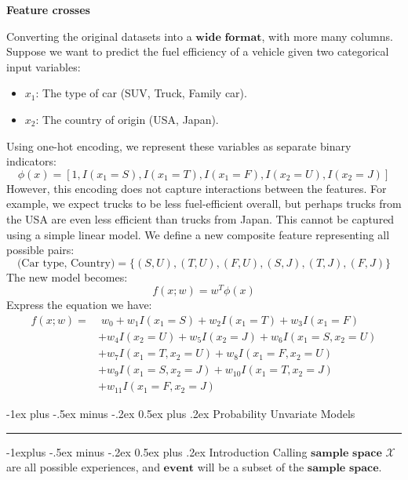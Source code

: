 \documentclass[10pt,landscape]{article}
\makeatletter
\renewcommand{\section}{\@startsection{section}{1}{0mm}%
                                {-1ex plus -.5ex minus -.2ex}%
                                {0.5ex plus .2ex}%
                                {\normalfont\large\bfseries}}
\renewcommand{\subsection}{\@startsection{subsection}{2}{0mm}%
                                {-1explus -.5ex minus -.2ex}%
                                {0.5ex plus .2ex}%
                                {\normalfont\normalsize\bfseries}}
\makeatother
\begin{document}
\begin{multicols*}{3}
    \textbf{Feature crosses}

    Converting the original datasets into a $\textbf{wide format}$, with more many columns. 
    Suppose we want to predict the fuel efficiency of a vehicle given two categorical input variables: 
    \begin{itemize}
        \item \( x_1 \): The type of car (SUV, Truck, Family car).
        \item \( x_2 \): The country of origin (USA, Japan).
    \end{itemize}
    Using one-hot encoding, we represent these variables as separate binary indicators:
    \[
    \phi(x) = [1, I(x_1 = S), I(x_1 = T), I(x_1 = F), I(x_2 = U), I(x_2 = J)]
    \]
    However, this encoding does not capture interactions between the features. For example, we expect trucks to be less fuel-efficient overall, but perhaps trucks from the USA are even less efficient than trucks from Japan. This cannot be captured using a simple linear model.
    We define a new composite feature representing all possible pairs:
    \[
    \text{(Car type, Country)} = \{(S, U), (T, U), (F, U), (S, J), (T, J), (F, J)\}
    \]
    The new model becomes:
    \[
    f(x; w) = w^T \phi(x)
    \]
    Express the equation we have:
    \begin{equation*}
        \begin{split}
            f(x; w) = & \; w_0 + w_1 I(x_1 = S) + w_2 I(x_1 = T) + w_3 I(x_1 = F) \\
            &+ w_4 I(x_2 = U) + w_5 I(x_2 = J) + w_6 I(x_1 = S, x_2 = U) \\
            &+ w_7 I(x_1 = T, x_2 = U) + w_8 I(x_1 = F, x_2 = U) \\
            &+ w_9 I(x_1 = S, x_2 = J) + w_{10} I(x_1 = T, x_2 = J)\\ 
            &+ w_{11} I(x_1 = F, x_2 = J)
        \end{split}
    \end{equation*}

\section{Probability Unvariate Models}\smallskip \hrule height 2pt \smallskip

\subsection{Introduction}
    Calling $\textbf{sample space}$ $\mathcal{X}$ are all possible experiences, and $\textbf{event}$ will be a subset of the $\textbf{sample space}$.
    

\end{multicols*}
\end{document}
